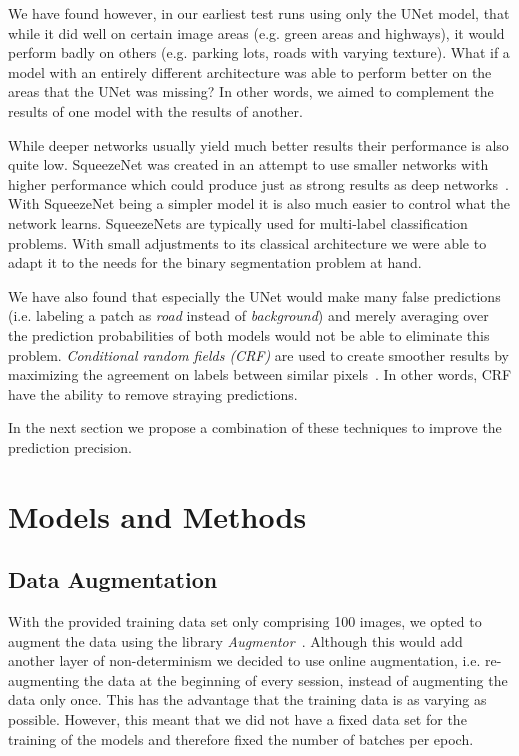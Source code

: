 \documentclass[10pt,conference,compsocconf]{IEEEtran}
\begin{document}
We have found however, in our earliest test runs using only the UNet model, that while it did well on certain image areas (e.g. green areas and highways), it would perform badly on others (e.g. parking lots, roads with varying texture). What if a model with an entirely different architecture was able to perform better on the areas that the UNet was missing? In other words, we aimed to complement the results of one model with the results of another.

While deeper networks usually yield much better results their performance is also quite low. SqueezeNet was created in an attempt to use smaller networks with higher performance which could produce just as strong results as deep networks~\cite{CoRR1}. With SqueezeNet being a simpler model it is also much easier to control what the network learns. SqueezeNets are typically used for multi-label classification problems. With small adjustments to its classical architecture we were able to adapt it to the needs for the binary segmentation problem at hand.

We have also found that especially the UNet would make many false predictions (i.e. labeling a patch as \textit{road} instead of \textit{background}) and merely averaging over the prediction probabilities of both models would not be able to eliminate this problem. \textit{Conditional random fields (CRF)} are used to create smoother results by maximizing the agreement on labels between similar pixels~\cite{NIPS2011_4296}. In other words, CRF have the ability to remove straying predictions.

In the next section we propose a combination of these techniques to improve the prediction precision.

\section{Models and Methods}
\subsection{Data Augmentation}
With the provided training data set only comprising 100 images, we opted to augment the data using the library \textit{Augmentor}~\cite{AugmeGL}. Although this would add another layer of non-determinism we decided to use online augmentation, i.e. re-augmenting the data at the beginning of every session, instead of augmenting the data only once. This has the advantage that the training data is as varying as possible. However, this meant that we did not have a fixed data set for the training of the models and therefore fixed the number of batches per epoch.
\end{document}
